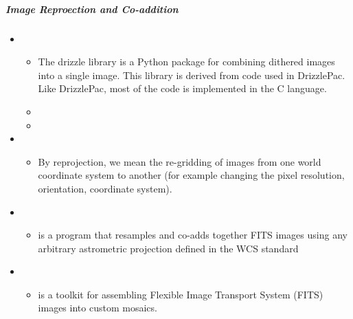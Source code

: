 \documentclass[letterpaper,10pt,english]{sphinxmanual}
\begin{document}
\subparagraph{Image Reproection and Co-addition}
\label{\detokenize{resource/astro/topics/ccd_reduction:image-reproection-and-co-addition}}\begin{itemize}
\item {} 
\begin{itemize}
\item {} 
The drizzle library is a Python package for combining dithered
images into a single image. This library is derived from code used
in DrizzlePac. Like DrizzlePac, most of the code is implemented in
the C language.

\item {} 

\item {} 

\end{itemize}

\item {} 
\begin{itemize}
\item {} 
By reprojection, we mean the re-gridding of images from one world
coordinate system to another (for example changing the pixel
resolution, orientation, coordinate system).

\end{itemize}

\item {} 
\begin{itemize}
\item {} 
 is a program that resamples and co-adds together FITS
images using any arbitrary astrometric projection defined in the
WCS standard

\end{itemize}

\item {} 
\begin{itemize}
\item {} 
 is a toolkit for assembling Flexible Image Transport
System (FITS) images into custom mosaics. 


\end{itemize}
\end{itemize}
\end{document}
